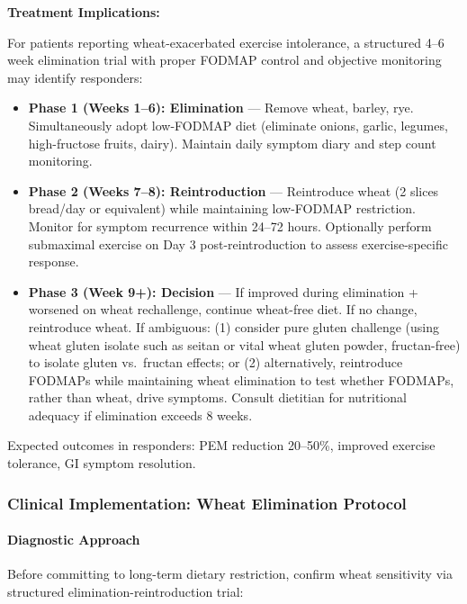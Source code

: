 \begin{speculation}
\textbf{Treatment Implications:}

For patients reporting wheat-exacerbated exercise intolerance, a structured 4--6 week elimination trial with proper FODMAP control and objective monitoring may identify responders:

\begin{itemize}
    \item \textbf{Phase 1 (Weeks 1--6): Elimination} --- Remove wheat, barley, rye. Simultaneously adopt low-FODMAP diet (eliminate onions, garlic, legumes, high-fructose fruits, dairy). Maintain daily symptom diary and step count monitoring.
    \item \textbf{Phase 2 (Weeks 7--8): Reintroduction} --- Reintroduce wheat (2 slices bread/day or equivalent) while maintaining low-FODMAP restriction. Monitor for symptom recurrence within 24--72 hours. Optionally perform submaximal exercise on Day 3 post-reintroduction to assess exercise-specific response.
    \item \textbf{Phase 3 (Week 9+): Decision} --- If improved during elimination + worsened on wheat rechallenge, continue wheat-free diet. If no change, reintroduce wheat. If ambiguous: (1) consider pure gluten challenge (using wheat gluten isolate such as seitan or vital wheat gluten powder, fructan-free) to isolate gluten vs.\ fructan effects; or (2) alternatively, reintroduce FODMAPs while maintaining wheat elimination to test whether FODMAPs, rather than wheat, drive symptoms. Consult dietitian for nutritional adequacy if elimination exceeds 8 weeks.
\end{itemize}

Expected outcomes in responders: PEM reduction 20--50\%, improved exercise tolerance, GI symptom resolution.

\end{speculation}

\subsubsection{Clinical Implementation: Wheat Elimination Protocol}

\paragraph{Diagnostic Approach}

Before committing to long-term dietary restriction, confirm wheat sensitivity via structured elimination-reintroduction trial:

